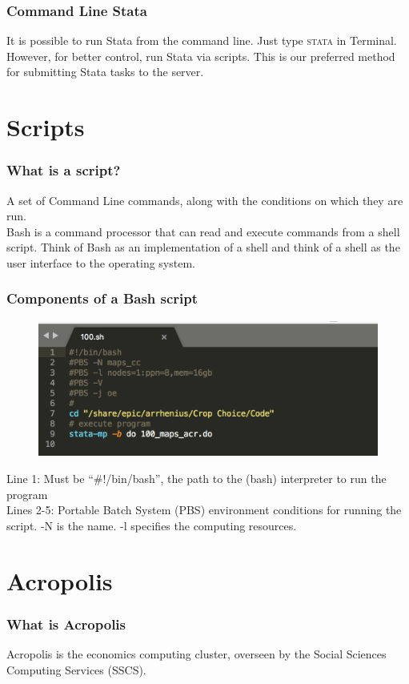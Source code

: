 \documentclass{beamer}
\begin{document}
\begin{frame}
	\frametitle{Command Line Stata}
	It is possible to run Stata from the command line. Just type \textsc{stata} in Terminal.
	\\[1em]\pause
	However, for better control, run Stata via scripts. This is our preferred method for submitting Stata tasks to the server.
\end{frame}

\section{Scripts}
\begin{frame}
	\frametitle{What is a script?}
	A set of Command Line commands, along with the conditions on which they are run.
	\\[1em]
	\pause
	Bash is a command processor that can read and execute commands from a shell script. Think of Bash as an implementation of a shell and think of a shell as the user interface to the operating system.
\end{frame}

\begin{frame}
	\frametitle{Components of a Bash script}
	\begin{figure}
		\centering
		\includegraphics[width=0.8\linewidth]{bash}
	\end{figure}
	\pause
	\small{Line 1: Must be ``\#!/bin/bash'', the path to the (bash) interpreter to run the program
	\\[0.5em]
	Lines 2-5: Portable Batch System (PBS) environment conditions for running the script. -N is the name. -l specifies the computing resources. }
\end{frame}

\section{Acropolis}
\begin{frame}
	\frametitle{What is Acropolis}
	Acropolis is the economics computing cluster, overseen by the Social Sciences Computing Services (SSCS).
\end{frame}
\end{document}
